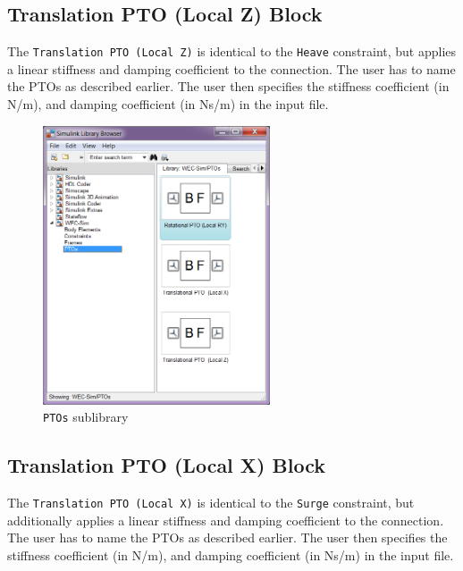         \subsection{Translation PTO (Local Z) Block}
        The \texttt{Translation PTO (Local Z)} is identical to the 
		\texttt{Heave} constraint, but applies a linear stiffness and 
		damping coefficient to the connection. The user has to name the PTOs as 
		described earlier. The user then specifies the stiffness coefficient (in N/m), and 
		damping coefficient (in Ns/m) in the input file.
	\begin{figure}[H]        
	\centering        
	\includegraphics[width=0.6\textwidth]{libraryStructure/figures/ptosLib}        
	\caption{\texttt{PTOs} sublibrary}        
	\label{fig:pLib}        
	\end{figure}
	
        \subsection{Translation PTO (Local X) Block}
        The \texttt{Translation PTO (Local X)} is identical to the 
		\texttt{Surge} constraint, but additionally applies a linear stiffness 
		and damping coefficient to the connection. The user has to name the PTOs as 
		described earlier. The user then specifies the stiffness coefficient (in N/m), and 
		damping coefficient (in Ns/m) in the input file.
	        
